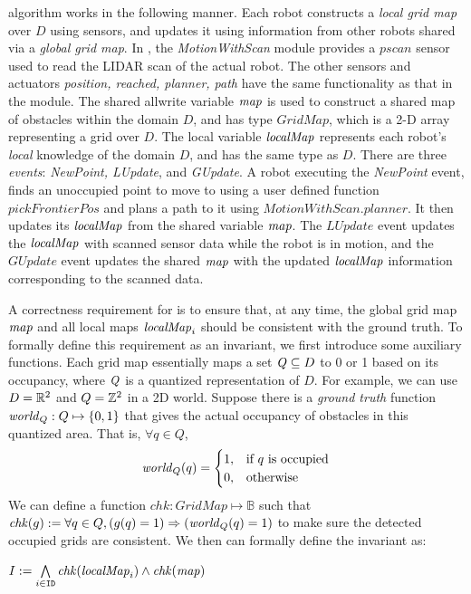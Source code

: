 \newcommand{\MotionWithScan}{\emph{MotionWithScan}\xspace}
\newcommand{\chk}{\ensuremath{\mathit{chk}}\xspace}

\DMap algorithm works in the following manner.
Each robot constructs a \emph{local grid map} over $D$ using sensors,
and updates it using information from other robots shared via a \emph{global grid map}.
In , the \MotionWithScan module provides a $\mathit{pscan}$ sensor used to read the LIDAR scan of the actual robot.
The other sensors and actuators {\it position, reached, planner, path} have the same functionality as that in the \Motion module.
The shared allwrite variable $\mathit{map}$ is used to construct a shared map of obstacles within the domain $D$,
and has type $\mathit{GridMap}$, which is a 2-D array representing a grid over $D$.
The local variable $\mathit{localMap}$ represents each robot's \emph{local} knowledge of the domain $D$, and has the same type as $D$.
There are three \emph{events}: \emph{NewPoint, LUpdate}, and \emph{GUpdate}.
A robot executing the \emph{NewPoint} event, finds an unoccupied point to move to using a user defined function $\mathit{pickFrontierPos}$
and plans a path to it using $\mathit{MotionWithScan.planner}$.
It then updates its $\mathit{localMap}$ from the shared variable $\mathit{map}$.
The $\mathit{LUpdate}$ event updates the $\mathit{localMap}$ with scanned sensor data while the robot is in motion,
and the $\mathit{GUpdate}$ event updates the shared $\mathit{map}$ with the updated $\mathit{localMap}$ information corresponding to the scanned data.

A correctness requirement for \DMap is to ensure that, at any time,
the global grid map $\mathit{map}$ and all local maps $\mathit{localMap}_i$ should be consistent with the ground truth.
To formally define this requirement as an invariant, we first introduce some auxiliary functions.
Each grid map essentially maps a set $\mathit{Q} \subseteq D$ to 0 or 1 based on its occupancy,
where $\mathit{Q}$ is a quantized representation of $D$.
For example, we can use $D=\reals^2$ and $Q=\integers^2$ in a 2D world.
Suppose there is a \emph{ground truth} function $\mathit{world}_Q : Q \mapsto \{0, 1\}$ that gives the actual occupancy of obstacles in this quantized area.
That is, $\forall q \in Q$,
\[
    \mathit{world}_Q(q) =
    \begin{cases}
        1, & \text{if $q$ is occupied}\\
        0, & \text{otherwise}
    \end{cases}
\]
We can define a function $\chk: GridMap \mapsto \mathbb{B}$ such that
$\chk(g) := \forall q \in Q, (g(q) = 1) \Rightarrow (\world_Q(q) = 1)$ to make sure the detected occupied grids are consistent.
We then can formally define the invariant as:
\begin{invariant}
    \label{inv:mapping}
    $I := \bigwedge\limits_{i \in \UINS} \chk(\lmap_i) \land \chk(\gmap)$
\end{invariant}

